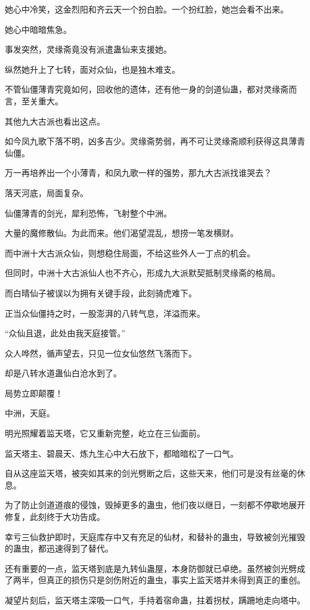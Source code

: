 \begin{this_body}
她心中冷笑，这金烈阳和齐云天一个扮白脸。一个扮红脸，她岂会看不出来。

她心中暗暗焦急。

事发突然，灵缘斋竟没有派遣蛊仙来支援她。

纵然她升上了七转，面对众仙，也是独木难支。

不管仙僵薄青究竟如何，回收他的遗体，还有他一身的剑道仙蛊，都对灵缘斋而言，至关重大。

其他九大古派也看出这点。

如今凤九歌下落不明，凶多吉少。灵缘斋势弱，再不可让灵缘斋顺利获得这具薄青仙僵。

万一再培养出一个小薄青，和凤九歌一样的强势，那九大古派找谁哭去？

落天河底，局面复杂。

仙僵薄青的剑光，犀利恐怖，飞射整个中洲。

大量的魔修散仙。为此而来。他们渴望混乱，想捞一笔发横财。

而中洲十大古派众仙，则想稳住局面，不给这些外人一丁点的机会。

但同时，中洲十大古派仙人也不齐心，形成九大派默契抵制灵缘斋的格局。

而白晴仙子被误以为拥有关键手段，此刻骑虎难下。

正当众仙僵持之时，一股澎湃的八转气息，洋溢而来。

“众仙且退，此处由我天庭接管。”

众人哗然，循声望去，只见一位女仙悠然飞落而下。

却是八转水道蛊仙白沧水到了。

局势立即颠覆！

中洲，天庭。

明光照耀着监天塔，它又重新完整，屹立在三仙面前。

监天塔主、碧晨天、炼九生心中大石放下，都暗暗松了一口气。

自从这座监天塔，被突如其来的剑光劈断之后，这些天来，他们可是没有丝毫的休息。

为了防止剑道道痕的侵蚀，毁掉更多的蛊虫，他们夜以继日，一刻都不停歇地展开修复，此刻终于大功告成。

幸亏三仙救护即时，天庭库存中又有充足的仙材，和替补的蛊虫，导致被剑光摧毁的蛊虫，都迅速得到了替代。

还有重要的一点，监天塔到底是九转仙蛊屋，本身防御就已卓绝。虽然被剑光劈成了两半，但真正的损伤只是剑伤附近的蛊虫，事实上监天塔并未得到真正的重创。

凝望片刻后，监天塔主深吸一口气，手持着宿命蛊，拄着拐杖，蹒跚地走向塔中。


\end{this_body}
